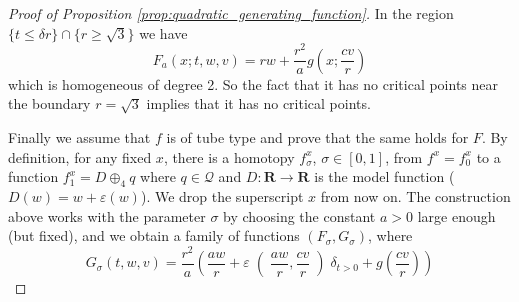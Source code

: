 \documentclass[reqno]{amsart}
\renewcommand{\epsilon}{\varepsilon}
\theoremstyle{theorem}
\theoremstyle{remark}
\theoremstyle{definition}
\newcommand{\del}{\partial}
\newcommand{\R}{\mathbf{R}}
\newcommand{\QQ}{\mathcal{Q}}
\begin{document}
\begin{proof}[Proof of Proposition \ref{prop:quadratic_generating_function}]
In the region $\{t\leq \delta r\} \cap \{r \geq \sqrt 3\}$ we have
\[F_a(x;t,w,v)=r w+\frac{r^2}{a} g\left(x;\frac{cv}{r}\right) \]
which is homogeneous of degree 2. So the fact that it has no critical points near the boundary $r=\sqrt{3}$ implies that it has no critical points. 








Finally we assume that $f$ is of tube type and prove that the same holds for $F$. By definition, for any fixed $x$, there is a homotopy $f^x_\sigma$, $\sigma \in [0,1]$, from $f^x=f^x_0$
to a function $f^x_1=D\oplus_4 q$ where $q\in \QQ$ and $D: \R\to \R$ is the model function ($D(w)=w+\epsilon(w)$). We drop the superscript $x$ from now on.
The construction above works with the parameter $\sigma$ by choosing the constant $a>0$ large enough (but fixed), and we obtain a family of functions $(F_\sigma, G_\sigma)$, where 
$$G_\sigma(t,w,v) = \frac{r^2}{a} \left( \frac{aw}{r} +  \varepsilon\right(\frac{aw}{r},\frac{cv}{r} \left) \delta_{t >0} + g \left(\frac{cv}{r} \right) \right) $$





\end{proof}
\end{document}
